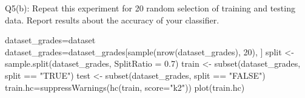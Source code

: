 \documentclass[
]{article}
\newenvironment{Shaded}{\begin{snugshade}}{\end{snugshade}}
\newcommand{\AttributeTok}[1]{\textcolor[rgb]{0.77,0.63,0.00}{#1}}
\newcommand{\DecValTok}[1]{\textcolor[rgb]{0.00,0.00,0.81}{#1}}
\newcommand{\FloatTok}[1]{\textcolor[rgb]{0.00,0.00,0.81}{#1}}
\newcommand{\FunctionTok}[1]{\textcolor[rgb]{0.00,0.00,0.00}{#1}}
\newcommand{\NormalTok}[1]{#1}
\newcommand{\OtherTok}[1]{\textcolor[rgb]{0.56,0.35,0.01}{#1}}
\newcommand{\SpecialCharTok}[1]{\textcolor[rgb]{0.00,0.00,0.00}{#1}}
\newcommand{\StringTok}[1]{\textcolor[rgb]{0.31,0.60,0.02}{#1}}
\begin{document}
Q5(b): Repeat this experiment for 20 random selection of training and
testing data. Report results about the accuracy of your classifier.

\begin{Shaded}
\begin{Highlighting}[]
\NormalTok{dataset\_grades}\OtherTok{=}\NormalTok{dataset}
\NormalTok{dataset\_grades}\OtherTok{=}\NormalTok{dataset\_grades[}\FunctionTok{sample}\NormalTok{(}\FunctionTok{nrow}\NormalTok{(dataset\_grades), }\DecValTok{20}\NormalTok{), ]}
\NormalTok{split }\OtherTok{\textless{}{-}} \FunctionTok{sample.split}\NormalTok{(dataset\_grades, }\AttributeTok{SplitRatio =} \FloatTok{0.7}\NormalTok{) }
\NormalTok{train }\OtherTok{\textless{}{-}} \FunctionTok{subset}\NormalTok{(dataset\_grades, split }\SpecialCharTok{==} \StringTok{"TRUE"}\NormalTok{) }
\NormalTok{test }\OtherTok{\textless{}{-}} \FunctionTok{subset}\NormalTok{(dataset\_grades, split }\SpecialCharTok{==} \StringTok{"FALSE"}\NormalTok{)}
\NormalTok{train.hc}\OtherTok{=}\FunctionTok{suppressWarnings}\NormalTok{(}\FunctionTok{hc}\NormalTok{(train, }\AttributeTok{score=}\StringTok{"k2"}\NormalTok{))}
\FunctionTok{plot}\NormalTok{(train.hc)}
\end{Highlighting}
\end{Shaded}

\begin{Shaded}
\end{Shaded}
\end{document}
